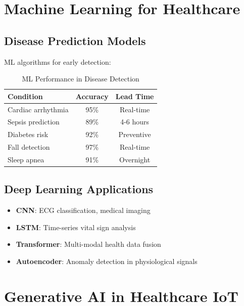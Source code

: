 \documentclass[12pt,a4paper]{article}
\begin{document}
\section{Machine Learning for Healthcare}

\subsection{Disease Prediction Models}

ML algorithms for early detection:
\begin{table}[H]
\centering
\caption{ML Performance in Disease Detection}
\begin{tabular}{lcc}
\toprule
\textbf{Condition} & \textbf{Accuracy} & \textbf{Lead Time} \\
\midrule
Cardiac arrhythmia & 95\% & Real-time \\
Sepsis prediction & 89\% & 4-6 hours \\
Diabetes risk & 92\% & Preventive \\
Fall detection & 97\% & Real-time \\
Sleep apnea & 91\% & Overnight \\
\bottomrule
\end{tabular}
\end{table}

\subsection{Deep Learning Applications}

\begin{itemize}
    \item \textbf{CNN}: ECG classification, medical imaging
    \item \textbf{LSTM}: Time-series vital sign analysis
    \item \textbf{Transformer}: Multi-modal health data fusion
    \item \textbf{Autoencoder}: Anomaly detection in physiological signals
\end{itemize}

\section{Generative AI in Healthcare IoT}
\end{document}
